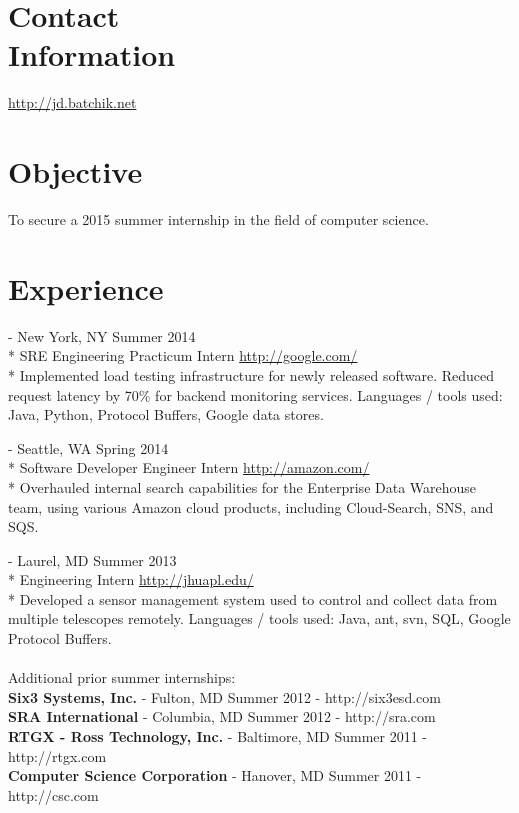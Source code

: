 \documentclass[a4paper,margin,line]{resume}
\newcommand{\rurl}[1]{\hfill {\footnotesize \url{#1}}}
\newcommand{\rdate}[1]{\hfill {\small #1}}
\renewcommand{\employer}[5]{ \item[#1] - #2 \rdate{#3} \\* #4 \rurl{#5} \\*}
\begin{document}
\begin{resume}
\section{\mysidestyle Contact \\ Information} \vspace{2mm}
	\begin{asparablank}
    \item \hfill
		\item \hfill \href{http://jd.batchik.net/}{http://jd.batchik.net}
		\item  \hfill 
	\end{asparablank}

\section{\mysidestyle Objective}
	To secure a 2015 summer internship in the field of computer science.

\section{\mysidestyle Experience}
	\begin{asparadesc}
        \employer{Google}{New York, NY}{Summer 2014}{SRE Engineering Practicum Intern}
        {http://google.com/}
		\small
        Implemented load testing infrastructure for newly released software.
        Reduced request latency by 70\% for backend monitoring services.
        Languages / tools used: Java, Python, Protocol Buffers, Google data stores.
		\normalsize
		\\
		\employer{Amazon}{Seattle, WA}{Spring 2014}{Software Developer Engineer Intern}
        {http://amazon.com/}
		\small
	    Overhauled internal search capabilities for the Enterprise Data Warehouse
        team, using various Amazon cloud products, including Cloud-Search, SNS,
        and SQS.
        \normalsize
		\\
		\employer{John Hopkins University Applied Physics Lab}{Laurel, MD}
        {Summer 2013}{Engineering Intern}{http://jhuapl.edu/}
		\small
		Developed a sensor management system used to control and collect data from
        multiple telescopes remotely. Languages / tools used: Java, ant, svn, SQL,
        Google Protocol Buffers.
        \normalsize
        \\
        \\
        Additional prior summer internships:\\
        \textbf{Six3 Systems, Inc.} - Fulton, MD \hfill Summer 2012 - http://six3esd.com \\
        \textbf{SRA International} - Columbia, MD \hfill Summer 2012 - http://sra.com \\
        \textbf{RTGX - Ross Technology, Inc.} - Baltimore, MD \hfill Summer 2011 - http://rtgx.com \\
        \textbf{Computer Science Corporation} - Hanover, MD \hfill Summer 2011 - http://csc.com
    \end{asparadesc}


\end{resume}
\end{document}
